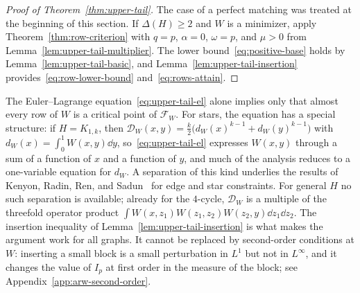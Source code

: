 \begin{proof}[Proof of Theorem~\ref{thm:upper-tail}]
The case of a perfect matching was treated at the beginning of this section.
If $\Delta(H)\ge2$ and $W$ is a minimizer, apply Theorem~\ref{thm:row-criterion}
with $q=p$, $\alpha=0$, $\omega=p$, and $\mu>0$ from
Lemma~\ref{lem:upper-tail-multiplier}.  The lower bound~\eqref{eq:positive-base}
holds by Lemma~\ref{lem:upper-tail-basic}, and Lemma~\ref{lem:upper-tail-insertion}
provides~\eqref{eq:row-lower-bound} and~\eqref{eq:rows-attain}.
\end{proof}

\begin{rmk}\label{rmk:why-global}
The Euler--Lagrange equation~\eqref{eq:upper-tail-el} alone implies only that
almost every row of $W$ is a critical point of $\mathcal F_W$.  For stars, the
equation has a special structure: if $H=K_{1,k}$, then
$\mathcal D_W(x,y)=\frac k2\bigl(d_W(x)^{k-1}+d_W(y)^{k-1}\bigr)$ with
$d_W(x)=\int_0^1W(x,y)\dd y$, so~\eqref{eq:upper-tail-el} expresses $W(x,y)$
through a sum of a function of $x$ and a function of $y$, and much of the
analysis reduces to a one-variable equation for $d_W$.  A separation of this
kind underlies the results of Kenyon, Radin, Ren, and
Sadun~\cite{KenyonRadinRenSadun2017} for edge and star constraints.  For general $H$ no such separation is available;
already for the $4$-cycle, $\mathcal D_W$ is a multiple of the threefold
operator product $\int W(x,z_1)W(z_1,z_2)W(z_2,y)\dd z_1\dd z_2$.  The insertion
inequality of Lemma~\ref{lem:upper-tail-insertion} is what makes the argument
work for all graphs.  It cannot be replaced by second-order conditions at $W$:
inserting a small block is a small perturbation in $L^1$ but not in
$L^\infty$, and it changes the value of $I_p$ at first order in the measure of
the block; see Appendix~\ref{app:arw-second-order}.
\end{rmk}
